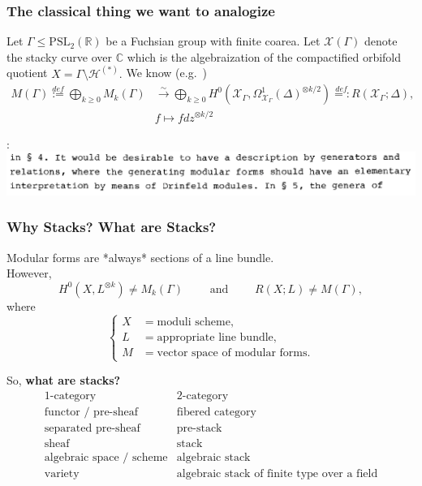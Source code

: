 \documentclass[handout]{beamer}
\numberwithin{equation}{section}
\numberwithin{case}{theorem}
\newcommand{\cH}{\mathcal{H}}		%
\newcommand{\sX}{\mathscr{X}}		%
\newcommand{\bbC}{\mathbb{C}}		%
\newcommand{\bbR}{\mathbb{R}}		%
\newcommand{\PSL}{\mathrm{PSL}} 	%
\newcommand{\<}{\left\langle}
\renewcommand{\>}{\right\rangle}
\begin{document}
	\begin{frame}
		\frametitle{The classical thing we want to analogize}
		Let $\Gamma\leq \PSL_2(\bbR)$ be a Fuchsian group with finite coarea. Let $\sX(\Gamma)$ denote the stacky curve over $\bbC$ which is the algebraization of the compactified orbifold quotient $X=\Gamma\setminus \cH^{(*)}.$ \pause We know (e.g.\ \cite[Chapter $6$]{VZB})
		\begin{align*}
			M(\Gamma)\overset{def}{:=}\bigoplus_{k\geq 0}M_k(\Gamma)&\overset{\sim}{\longrightarrow} \bigoplus_{k\geq 0} H^0(\sX_{\Gamma},\Omega^1_{\sX_{\Gamma}}(\Delta)^{\otimes k/2})\overset{def}{=:}R(\sX_{\Gamma};\Delta),\\
			&f\mapsto fdz^{\otimes k/2}
		\end{align*}
		
		\pause 
		
		\cite[page $13$]{Gekeler-Curves}:
		\includegraphics[scale=0.45]{gek-pg13.png}
	\end{frame}	
	
	\begin{frame}
		\frametitle{Why Stacks? What are Stacks?}
		Modular forms are *always* sections of a line bundle.\\ \pause
		However, \[H^0(X,L^{\otimes k})\neq M_k(\Gamma)\quad\quad \text{ and }\quad\quad R(X;L)\neq M(\Gamma),\] 
		where
		\[\begin{cases}
			X &= \text{moduli scheme},\\ 
			L &= \text{appropriate line bundle},\\
			M &= \text{vector space of modular forms}.
		\end{cases}\] \pause
		
		So, \textbf{what are stacks?} \pause
		\[\begin{array}{c|c}
			1\text{-category}&2\text{-category}\\ 
			\hline
			\text{functor / pre-sheaf}&\text{fibered category}\\ 
			\text{separated pre-sheaf}&\text{pre-stack}\\ 
			\text{sheaf}&\text{stack}\\ 
			\text{algebraic space / scheme}&\text{algebraic stack}\\
			\text{variety}&\text{algebraic stack of finite type over a field}
		\end{array}\]
	\end{frame}
	
\end{document}
